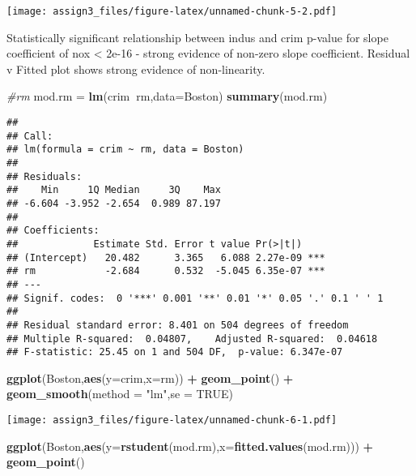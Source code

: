 \documentclass[]{article}
\newenvironment{Shaded}{\begin{snugshade}}{\end{snugshade}}
\newcommand{\CommentTok}[1]{\textcolor[rgb]{0.56,0.35,0.01}{\textit{#1}}}
\newcommand{\DataTypeTok}[1]{\textcolor[rgb]{0.13,0.29,0.53}{#1}}
\newcommand{\KeywordTok}[1]{\textcolor[rgb]{0.13,0.29,0.53}{\textbf{#1}}}
\newcommand{\NormalTok}[1]{#1}
\newcommand{\OperatorTok}[1]{\textcolor[rgb]{0.81,0.36,0.00}{\textbf{#1}}}
\newcommand{\OtherTok}[1]{\textcolor[rgb]{0.56,0.35,0.01}{#1}}
\newcommand{\StringTok}[1]{\textcolor[rgb]{0.31,0.60,0.02}{#1}}
\begin{document}
\texttt{[image: assign3\_files/figure-latex/unnamed-chunk-5-2.pdf]}

Statistically significant relationship between indus and crim p-value
for slope coefficient of nox \textless{} 2e-16 - strong evidence of
non-zero slope coefficient. Residual v Fitted plot shows strong evidence
of non-linearity.

\begin{Shaded}
\begin{Highlighting}[]
\CommentTok{#rm}
\NormalTok{mod.rm =}\StringTok{ }\KeywordTok{lm}\NormalTok{(crim}\OperatorTok{~}\NormalTok{rm,}\DataTypeTok{data=}\NormalTok{Boston)}
\KeywordTok{summary}\NormalTok{(mod.rm)}
\end{Highlighting}
\end{Shaded}

\begin{verbatim}
## 
## Call:
## lm(formula = crim ~ rm, data = Boston)
## 
## Residuals:
##    Min     1Q Median     3Q    Max 
## -6.604 -3.952 -2.654  0.989 87.197 
## 
## Coefficients:
##             Estimate Std. Error t value Pr(>|t|)    
## (Intercept)   20.482      3.365   6.088 2.27e-09 ***
## rm            -2.684      0.532  -5.045 6.35e-07 ***
## ---
## Signif. codes:  0 '***' 0.001 '**' 0.01 '*' 0.05 '.' 0.1 ' ' 1
## 
## Residual standard error: 8.401 on 504 degrees of freedom
## Multiple R-squared:  0.04807,    Adjusted R-squared:  0.04618 
## F-statistic: 25.45 on 1 and 504 DF,  p-value: 6.347e-07
\end{verbatim}

\begin{Shaded}
\begin{Highlighting}[]
\KeywordTok{ggplot}\NormalTok{(Boston,}\KeywordTok{aes}\NormalTok{(}\DataTypeTok{y=}\NormalTok{crim,}\DataTypeTok{x=}\NormalTok{rm)) }\OperatorTok{+}\StringTok{ }\KeywordTok{geom_point}\NormalTok{() }\OperatorTok{+}\StringTok{ }\KeywordTok{geom_smooth}\NormalTok{(}\DataTypeTok{method =} \StringTok{"lm"}\NormalTok{,}\DataTypeTok{se =} \OtherTok{TRUE}\NormalTok{)}
\end{Highlighting}
\end{Shaded}

\texttt{[image: assign3\_files/figure-latex/unnamed-chunk-6-1.pdf]}

\begin{Shaded}
\begin{Highlighting}[]
\KeywordTok{ggplot}\NormalTok{(Boston,}\KeywordTok{aes}\NormalTok{(}\DataTypeTok{y=}\KeywordTok{rstudent}\NormalTok{(mod.rm),}\DataTypeTok{x=}\KeywordTok{fitted.values}\NormalTok{(mod.rm))) }\OperatorTok{+}\StringTok{ }\KeywordTok{geom_point}\NormalTok{() }
\end{Highlighting}
\end{Shaded}
\end{document}
